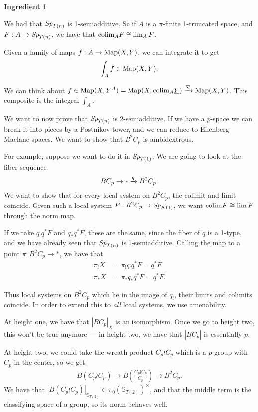 \begin{center}
    \textbf{Ingredient 1}
\end{center}

We had that $\textit{Sp}_{T(n)}$ is 1-semiadditive. So if $A$ is a $\pi$-finite 1-truncated space, and $F: A \to \textit{Sp}_{T(n)}$, we have that $\text{colim}_A F \cong \lim_A F$.

Given a family of maps $f: A \to \text{Map}(X,Y)$, we can integrate it to get
\begin{align*}
    \int_A f \in \text{Map}(X,Y).
\end{align*}

We can think about $f\in \text{Map}(X,Y^A) = \text{Map}(X, \text{colim}_A \underline{Y}) \xrightarrow{\nabla} \text{Map}(X,Y)$. This composite is the integral $\int_A$.

We want to now prove that $\textit{Sp}_{T(n)}$ is 2-semiadditive. If we have a $p$-space we can break it into pieces by a Postnikov tower, and we can reduce to Eilenberg-Maclane spaces. We want to show that $B^2 C_p$ is ambidextrous.

For example, suppose we want to do it in $\textit{Sp}_{T(1)}$. We are going to look at the fiber sequence
\begin{align*}
    BC_p \to \ast \xrightarrow{q} B^2 C_p.
\end{align*}
We want to show that for every local system on $B^2 C_p$, the colimit and limit coincide. Given such a local system $F: B^2 C_p \to \textit{Sp}_{K(1)}$, we want $\text{colim} F \cong \lim F$ through the norm map.

If we take $q_! q^\ast F$ and $q_\ast q^\ast F$, these are the same, since the fiber of $q$ is a 1-type, and we have already seen that $\textit{Sp}_{T(n)}$ is 1-semiadditive. Calling the map to a point $\pi: B^2 C_p \to \ast$, we have that
\begin{align*}
    \pi_! X &= \pi_! q_! q^\ast F = q^\ast F \\
    \pi_\ast X &= \pi_\ast q_\ast q^\ast F = q^\ast F.
\end{align*}

Thus local systems on $B^2 C_p$ which lie in the image of $q_!$, their limits and colimits coincide. In order to extend this to \textit{all} local systems, we use amenability.

At height one, we have that $|BC_p|_X$ is an isomorphism. Once we go to height two, this won't be true anymore --- in height two, we have that $|BC_p|$ is essentially $p$.

At height two, we could take the wreath product $C_p \wr C_p$ which is a $p$-group with $C_p$ in the center, so we get
\begin{align*}
    B \left( C_p \wr C_p \right) \to B \left( \frac{C_p \wr C_p}{C_p} \right) \to B^2 C_p.
\end{align*}
We have that $\left| B \left( C_p \wr C_p \right) \right|_{\mathbb{S}_{T(2)}} \in \pi_0 \left( \mathbb{S}_{T(2)} \right)^\times$, and that the middle term is the classifying space of a group, so its norm behaves well.

